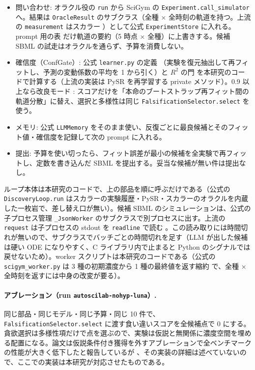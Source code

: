 \documentclass{article}
\begin{document}
\begin{itemize}
\item 問い合わせ: オラクル役の \texttt{run} から SciGym の \texttt{Experiment.call\_simulator} へ。結果は \texttt{OracleResult} のサブクラス（全種 × 全時刻の軌道を持つ。上流の \texttt{measurement} はスカラー \cite[s2.p34]{kabra-2026-llm}）として公式 \texttt{ExperimentStore} に入れる。prompt 用の表 \cite[s2.p33]{kabra-2026-llm} だけ軌道の要約（5 時点 × 全種）に上書きする。候補 SBML の試走はオラクルを通らず、予算を消費しない。
\item 確信度（ConfGate）: 公式 \texttt{learner.py} の定義 \cite[s2.p35]{kabra-2026-llm}（実験を復元抽出して再フィットし、予測の変動係数の平均を 1 から引く）と $R^2$ の門 \cite[s2.p36]{kabra-2026-llm} を本研究のコードで計算する（上流の実装は PySR を再学習する private メソッド）。0.9 以上なら改良モード \cite[s2.p12]{kabra-2026-llm}: スコアだけを「本命のブートストラップ再フィット間の軌道分散」に替え、選択と多様性は同じ \texttt{FalsificationSelector.select} を使う。
\item メモリ: 公式 \texttt{LLMMemory} をそのまま使い、反復ごとに最良候補とそのフィット値・確信度を記録して次の prompt に入れる。
\item 提出: 予算を使い切ったら、フィット誤差が最小の候補を全実験で再フィットし、定数を書き込んだ SBML を提出する。妥当な候補が無い件は提出なし。
\end{itemize}
ループ本体は本研究のコードで、上の部品を順に呼ぶだけである（公式の \texttt{DiscoveryLoop.run} はスカラーの実験履歴・PySR・スカラーのオラクルを内蔵した一枚岩で、差し替え口が無い）。候補 SBML のシミュレーションは、公式の子プロセス管理 \texttt{\_JsonWorker} のサブクラスで別プロセスに出す。上流の \texttt{request} は子プロセスの stdout を \texttt{readline} で読む \cite[s2.p32]{kabra-2026-llm}。この読み取りには時間切れが無いので、サブクラスでバッチごとの時間切れを足す（LLM が出した候補は硬い ODE になりやすく、C ライブラリ内で止まると Python のシグナルでは戻せないため）。worker スクリプトは本研究のコードである（公式の \texttt{scigym\_worker.py} は 3 種の初期濃度から 1 種の最終値を返す縮約 \cite[s2.p14]{kabra-2026-llm} で、全種 × 全時刻を返すには中身の改変が要る）。

\paragraph{アブレーション（run \texttt{autoscilab-nohyp-luna}）.}
同じ部品・同じモデル・同じ予算・同じ 10 件で、\texttt{FalsificationSelector.select} に渡す食い違いスコアを全候補点で 0 にする。貪欲選択は多様性項だけで点を選ぶので、実験は仮説と無関係に濃度空間を埋める配置になる。論文は仮説条件付き獲得を外すアブレーションで全ベンチマークの性能が大きく低下したと報告しているが \cite[s2.p7]{kabra-2026-llm}、その実装の詳細は述べていないので、ここでの実装は本研究が対応させたものである。
\end{document}
